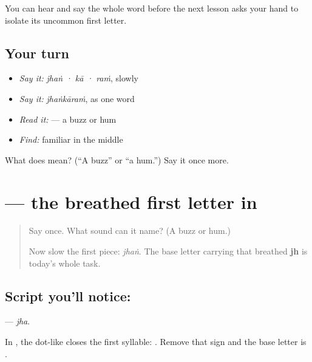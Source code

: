 \begin{grammarlens}[title={What you've built}]
You can hear and say the whole word before the next lesson asks your hand to isolate its uncommon first letter.
\end{grammarlens}

\subsection*{Your turn}
\begin{itemize}
\raggedright
  \item \emph{Say it:} \emph{jhaṅ · kā · raṁ}, slowly
  \item \emph{Say it:} \emph{jhaṅkāraṁ}, as one word
  \item \emph{Read it:} \textbf{} — a buzz or hum
  \item \emph{Find:} familiar \textbf{} in the middle
\end{itemize}

\begin{tcolorbox}[breakable,colback=teal!4,colframe=teal!35!black,title={Before you move on}]
What does \textbf{} mean? (\textquotedblleft{}A buzz\textquotedblright{} or \textquotedblleft{}a hum.\textquotedblright{}) Say it once more.
\end{tcolorbox}
\section[\texorpdfstring{\te{ఝ} (jha)}{ఝ (jha)}]{ — the breathed first letter in }

\label{lesson:TE-S173-letter-jha}



\begin{quote}
Say \textbf{} once. What sound can it name? (A buzz or hum.)

Now slow the first piece: \emph{jhaṅ}. The base letter carrying that breathed \textbf{jh} is today's whole task.
\end{quote}

\subsection*{Script you'll notice: }
\textbf{} — \emph{jha}.

In \textbf{}, the dot-like \textbf{} closes the first syllable: \textbf{}. Remove that sign and the base letter is \textbf{}.

